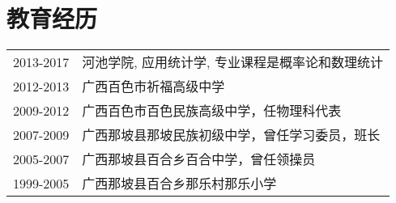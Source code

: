 \section{教育经历}
\begin{tabular}{ll}
  2013-2017 & 河池学院, 应用统计学, 专业课程是概率论和数理统计 \\
  2012-2013 & 广西百色市祈福高级中学 \\
  2009-2012 & 广西百色市百色民族高级中学，任物理科代表  \\
  2007-2009 & 广西那坡县那坡民族初级中学，曾任学习委员，班长  \\
  2005-2007 & 广西那坡县百合乡百合中学，曾任领操员  \\
  1999-2005 & 广西那坡县百合乡那乐村那乐小学 \\
\end{tabular}
